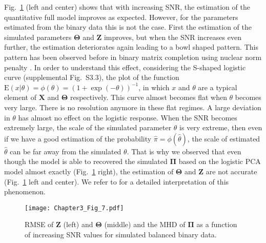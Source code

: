 Fig.~\ref{chapter3_fig:7} (left and center) shows that with increasing SNR, the estimation of the quantitative full model improves as expected. However, for the parameters estimated from the binary data this is not the case. First the estimation of the simulated parameters $\mathbf{\Theta}$ and $\mathbf{Z}$ improves, but when the SNR increases even further, the estimation deteriorates again leading to a bowl shaped pattern. This pattern has been observed before in binary matrix completion using nuclear norm penalty \cite{davenport20141}. In order to understand this effect, considering the S-shaped logistic curve (supplemental Fig.~S3.3), the plot of the function $\text{E}(x|\theta) = \phi(\theta) = (1+\exp(-\theta))^{-1}$, in which $x$ and $\theta$ are a typical element of $\mathbf{X}$ and $\mathbf{\Theta}$ respectively. This curve almost becomes flat when $\theta$ becomes very large. There is no resolution anymore in these flat regimes. A large deviation in $\theta$ has almost no effect on the logistic response. When the SNR becomes extremely large, the scale of the simulated parameter $\theta$ is very extreme, then even if we have a good estimation of the probability $\hat{\pi} = \phi(\hat{\theta})$, the scale of estimated $\hat{\theta}$ can be far away from the simulated $\theta$. That is why we observed that even though the model is able to recovered the simulated $\mathbf{\Pi}$ based on the logistic PCA model almost exactly (Fig.~\ref{chapter3_fig:7} right), the estimation of $\mathbf{\Theta}$ and $\mathbf{Z}$ are not accurate (Fig.~\ref{chapter3_fig:7} left and center). We refer to \cite{davenport20141} for a detailed interpretation of this phenomenon.

\begin{figure}[htbp]
    \centering
    \texttt{[image: Chapter3\_Fig\_7.pdf]}
    \caption{RMSE of $\mathbf{Z}$ (left) and $\mathbf{\Theta}$ (middle) and the MHD of $\mathbf{\Pi}$ as a function of increasing SNR values for simulated balanced binary data.}
    \label{chapter3_fig:7}
\end{figure}


